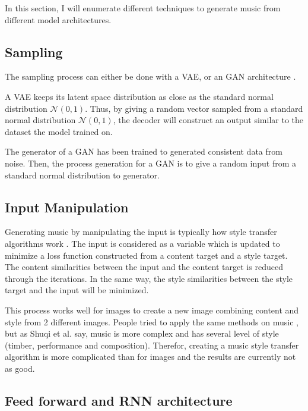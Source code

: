 \documentclass[12pt]{report}
\begin{document}
In this section, I will enumerate different techniques to generate music from different model architectures.

\subsection{Sampling}

The sampling process can either be done with a VAE, or an GAN architecture \cite{donahue_adversarial_2019}.

A VAE keeps its latent space distribution as close as the standard normal distribution $\mathcal{N}(0, 1)$.
Thus, by giving a random vector sampled from a standard normal distribution $\mathcal{N}(0, 1)$, the decoder will construct an output similar to the dataset the model trained on.

The generator of a GAN has been trained to generated consistent data from noise.
Then, the process generation for a GAN is to give a random input from a standard normal distribution to generator.

\subsection{Input Manipulation}

Generating music by manipulating the input is typically how style transfer algorithms work \cite{shetty_neural_2019, gatys_neural_2015, li_universal_2017}.
The input is considered as a variable which is updated to minimize a loss function constructed from a content target and a style target.
The content similarities between the input and the content target is reduced through the iterations.
In the same way, the style similarities between the style target and the input will be minimized.

This process works well for images to create a new image combining content and style from 2 different images.
People tried to apply the same methods on music \cite{kaliakatsos-papakostas_conceptual_2017, hung_musical_2019, brunner_symbolic_2018, lu_play_2018}, but as Shuqi et al. \cite{dai_music_2018} say, music is more complex and has several level of style (timber, performance and composition).
Therefor, creating a music style transfer algorithm is more complicated than for images and the results are currently not as good.

\subsection{Feed forward and RNN architecture}
\end{document}
